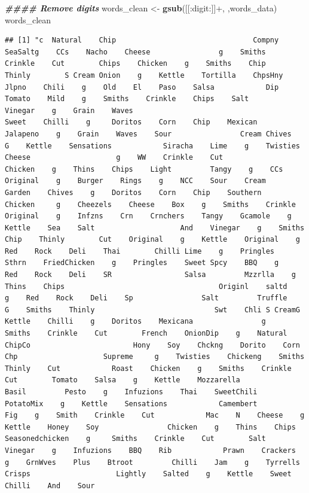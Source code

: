 \documentclass[
]{article}
\newenvironment{Shaded}{\begin{snugshade}}{\end{snugshade}}
\newcommand{\DocumentationTok}[1]{\textcolor[rgb]{0.56,0.35,0.01}{\textbf{\textit{#1}}}}
\newcommand{\FunctionTok}[1]{\textcolor[rgb]{0.13,0.29,0.53}{\textbf{#1}}}
\newcommand{\NormalTok}[1]{#1}
\newcommand{\OtherTok}[1]{\textcolor[rgb]{0.56,0.35,0.01}{#1}}
\newcommand{\StringTok}[1]{\textcolor[rgb]{0.31,0.60,0.02}{#1}}
\begin{document}
\begin{Shaded}
\begin{Highlighting}[]
\DocumentationTok{\#\#\#\# Remove digits}
\NormalTok{words\_clean }\OtherTok{\textless{}{-}} \FunctionTok{gsub}\NormalTok{(}\StringTok{\textquotesingle{}[[:digit:]]+\textquotesingle{}}\NormalTok{, }\StringTok{\textquotesingle{}\textquotesingle{}}\NormalTok{,words\_data)}
\NormalTok{words\_clean}
\end{Highlighting}
\end{Shaded}

\begin{verbatim}
## [1] "c  Natural    Chip                                Compny    SeaSaltg    CCs    Nacho    Cheese                g    Smiths    Crinkle    Cut        Chips    Chicken    g    Smiths    Chip    Thinly        S Cream Onion    g    Kettle    Tortilla    ChpsHny Jlpno    Chili    g    Old    El    Paso    Salsa            Dip    Tomato    Mild    g    Smiths    Crinkle    Chips    Salt         Vinegar    g    Grain    Waves                                    Sweet    Chilli    g     Doritos    Corn    Chip    Mexican    Jalapeno    g    Grain    Waves    Sour                Cream Chives    G    Kettle    Sensations            Siracha    Lime    g    Twisties    Cheese                    g    WW    Crinkle    Cut                        Chicken    g    Thins    Chips    Light         Tangy    g    CCs    Original    g    Burger    Rings    g    NCC    Sour    Cream                     Garden    Chives    g    Doritos    Corn    Chip    Southern    Chicken     g    Cheezels    Cheese    Box    g    Smiths    Crinkle                        Original    g    Infzns    Crn    Crnchers    Tangy    Gcamole    g    Kettle    Sea    Salt                    And    Vinegar    g    Smiths    Chip    Thinly        Cut    Original    g    Kettle    Original    g    Red    Rock    Deli    Thai        Chilli Lime    g    Pringles    Sthrn    FriedChicken    g    Pringles    Sweet Spcy    BBQ    g    Red    Rock    Deli    SR                 Salsa         Mzzrlla    g    Thins    Chips                                    Originl    saltd    g    Red    Rock    Deli    Sp                Salt         Truffle    G    Smiths    Thinly                            Swt    Chli S CreamG    Kettle    Chilli    g    Doritos    Mexicana                g    Smiths    Crinkle    Cut        French    OnionDip    g    Natural    ChipCo                        Hony    Soy    Chckng    Dorito    Corn    Chp                    Supreme     g    Twisties    Chickeng    Smiths    Thinly    Cut            Roast    Chicken    g    Smiths    Crinkle    Cut        Tomato    Salsa    g    Kettle    Mozzarella            Basil         Pesto    g    Infuzions    Thai    SweetChili    PotatoMix    g    Kettle    Sensations            Camembert         Fig    g    Smith    Crinkle    Cut            Mac    N    Cheese    g    Kettle    Honey    Soy                Chicken    g    Thins    Chips    Seasonedchicken    g     Smiths    Crinkle    Cut        Salt         Vinegar    g    Infuzions    BBQ    Rib            Prawn    Crackers    g    GrnWves    Plus    Btroot         Chilli    Jam    g    Tyrrells    Crisps                    Lightly    Salted    g    Kettle    Sweet    Chilli    And    Sour    
\end{verbatim}
\end{document}
